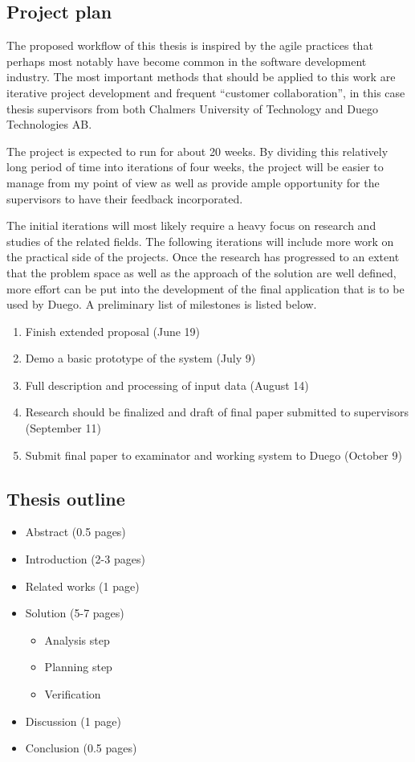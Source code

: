 \documentclass[10pt,twocolumn]{article}
\begin{document}
\subsection{Project plan}
The proposed workflow of this thesis is inspired by the agile practices that perhaps most notably have become common in the software development industry. The most important methods that should be applied to this work are iterative project development and frequent ``customer collaboration'', in this case thesis supervisors from both Chalmers University of Technology and Duego Technologies AB.

The project is expected to run for about 20 weeks. By dividing this relatively long period of time into iterations of four weeks, the project will be easier to manage from my point of view as well as provide ample opportunity for the supervisors to have their feedback incorporated.

The initial iterations will most likely require a heavy focus on research and studies of the related fields. The following iterations will include more work on the practical side of the projects. Once the research has progressed to an extent that the problem space as well as the approach of the solution are well defined, more effort can be put into the development of the final application that is to be used by Duego. A preliminary list of milestones is listed below.

\begin{enumerate}
	\item Finish extended proposal (June 19)
	\item Demo a basic prototype of the system (July 9)
	\item Full description and processing of input data (August 14)
	\item Research should be finalized and draft of final paper submitted to supervisors (September 11)
	\item Submit final paper to examinator and working system to Duego (October 9)
\end{enumerate}

\subsection{Thesis outline}
\begin{itemize}
	\item Abstract (0.5 pages)
 	\item Introduction (2-3 pages)
 	\item Related works (1 page)
 	\item Solution (5-7 pages)
 	\begin{itemize}
		\item Analysis step
		\item Planning step
		\item Verification
	\end{itemize}
	\item Discussion (1 page)
	\item Conclusion (0.5 pages)
\end{itemize}


\end{document}
